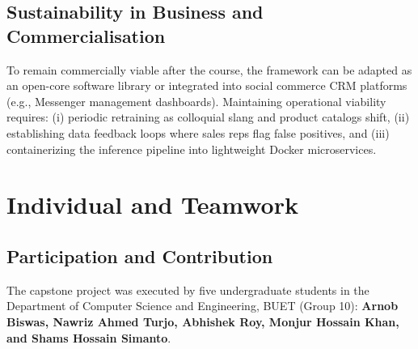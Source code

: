 \subsection{Sustainability in Business and Commercialisation}
\label{sec:commercialisation}

To remain commercially viable after the course, the framework can be adapted as an open-core software library or integrated into social commerce CRM platforms (e.g., Messenger management dashboards). Maintaining operational viability requires: (i) periodic retraining as colloquial slang and product catalogs shift, (ii) establishing data feedback loops where sales reps flag false positives, and (iii) containerizing the inference pipeline into lightweight Docker microservices.

\section{Individual and Teamwork}
\label{sec:team}

\subsection{Participation and Contribution}
\label{sec:participation}

The capstone project was executed by five undergraduate students in the Department of Computer Science and Engineering, BUET (Group 10): \textbf{Arnob Biswas, Nawriz Ahmed Turjo, Abhishek Roy, Monjur Hossain Khan, and Shams Hossain Simanto}. 

